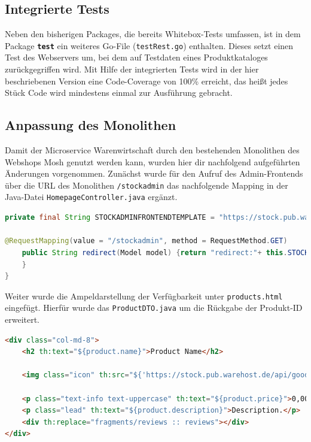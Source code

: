 \newpage
\subsection{Integrierte Tests}
\label{subsec: Integrierte Test}
Neben den bisherigen Packages, die bereits Whitebox-Tests umfassen, ist in dem Package \textbf{\texttt{test}} ein weiteres Go-File (\texttt{testRest.go}) enthalten. Dieses setzt einen Test des Webservers um, bei dem auf Testdaten eines Produktkataloges zurückgegriffen wird. Mit Hilfe der integrierten Tests wird in der hier beschriebenen Version eine Code-Coverage von 100\% erreicht, das heißt jedes Stück Code wird mindestens einmal zur Ausführung gebracht.

\subsection{Anpassung des Monolithen}
\label{subsec: Anpassung des Monolithen}
Damit der Microservice Warenwirtschaft durch den bestehenden Monolithen des Webshops Mosh genutzt werden kann, wurden hier dir nachfolgend aufgeführten Änderungen vorgenommen. Zunächst wurde für den Aufruf des Admin-Frontends über die URL des Monolithen \texttt{/stockadmin} das nachfolgende Mapping in der Java-Datei \texttt{HomepageController.java} ergänzt.

\begin{lstlisting}[caption=Anpassung in HomepageController.java, language=Java]
private final String STOCKADMINFRONTENDTEMPLATE = "https://stock.pub.warehost.de/index.html";

@RequestMapping(value = "/stockadmin", method = RequestMethod.GET)
	public String redirect(Model model) {return "redirect:"+ this.STOCKADMINFRONTENDTEMPLATE;
	}
}
\end{lstlisting}

Weiter wurde die Ampeldarstellung der Verfügbarkeit unter \texttt{products.html} eingefügt. Hierfür wurde das \texttt{ProductDTO.java} um die Rückgabe der Produkt-ID erweitert.

\begin{lstlisting}[caption=Anpassung products.html, language=HTML]
<div class="col-md-8">
	<h2 th:text="${product.name}">Product Name</h2>
	
	<img class="icon" th:src="${'https://stock.pub.warehost.de/api/good/availablity/'+product.id}"/>
	
	<p class="text-info text-uppercase" th:text="${product.price}">0,00 Euro</p>
	<p class="lead" th:text="${product.description}">Description.</p>
	<div th:replace="fragments/reviews :: reviews"></div>
</div>
\end{lstlisting}



\begin{lstlisting}[caption=Anpassung ProductDTO.java, language=Java]
 
 
\end{lstlisting}


